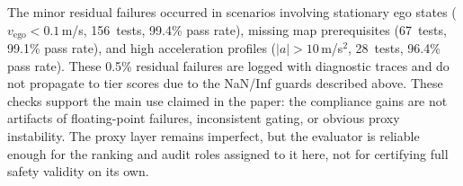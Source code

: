 The minor residual failures occurred in scenarios involving stationary ego states ($v_{\text{ego}} < 0.1$\,m/s, 156~tests, 99.4\% pass rate), missing map prerequisites (67~tests, 99.1\% pass rate), and high acceleration profiles ($|a| > 10$\,m/s$^2$, 28~tests, 96.4\% pass rate). These 0.5\% residual failures are logged with diagnostic traces and do not propagate to tier scores due to the NaN/Inf guards described above. These checks support the main use claimed in the paper: the compliance gains are not artifacts of floating-point failures, inconsistent gating, or obvious proxy instability. The proxy layer remains imperfect, but the evaluator is reliable enough for the ranking and audit roles assigned to it here, not for certifying full safety validity on its own.